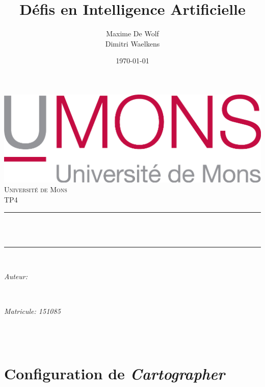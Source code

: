 \documentclass[10pt,a4paper]{article}
\title{Défis en Intelligence Artificielle}                             %
\author{Maxime De Wolf\\
		Dimitri Waelkens}                               %
\date{\today}                                           %
\makeatletter
\let\thetitle\@title
\let\theauthor\@author
\let\thedate\@date
\makeatother
\begin{document}
   	
   	
   	\begin{titlepage}
   		\centering
   		\vspace*{0.5 cm}
   		\includegraphics[scale = 0.75]{UMONS}\\[1.0 cm]   %
   		\textsc{\LARGE Université de Mons}\\[2.0 cm]   %
   		\textsc{\large TP4}\\[0.5 cm]               %
   		\rule{\linewidth}{0.2 mm} \\[0.4 cm]
   		{ \huge \bfseries \thetitle}\\
   		\rule{\linewidth}{0.2 mm} \\[1.5 cm]
   		
   		\begin{minipage}{0.4\textwidth}
   			\begin{flushleft} \large
   				\emph{Auteur:}\\
   				\theauthor
   			\end{flushleft}
   		\end{minipage}~
   		\begin{minipage}{0.4\textwidth}
   			\begin{flushright} \large
   				\emph{Matricule: 151085}                                  %
   			\end{flushright}
   		\end{minipage}\\[2 cm]
   		
   		{\large \thedate}\\[2 cm]
   		
   		\vfill
   		
   	\end{titlepage}
   	
   	
   	\section{Configuration de \textit{Cartographer}}
   	
\end{document}
